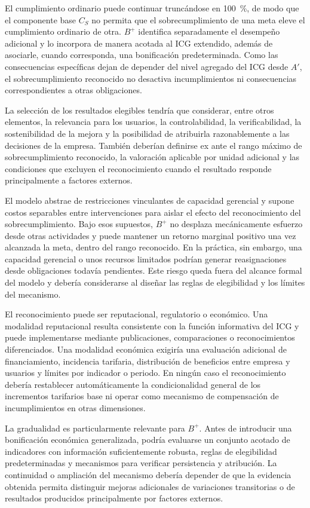 El cumplimiento ordinario puede continuar truncándose en 100~\%, de modo que el componente base \(C_S\) no permita que el sobrecumplimiento de una meta eleve el cumplimiento ordinario de otra. \(B^{+}\) identifica separadamente el desempeño adicional y lo incorpora de manera acotada al ICG extendido, además de asociarle, cuando corresponda, una bonificación predeterminada. Como las consecuencias específicas dejan de depender del nivel agregado del ICG desde \(A'\), el sobrecumplimiento reconocido no desactiva incumplimientos ni consecuencias correspondientes a otras obligaciones.

La selección de los resultados elegibles tendría que considerar, entre otros elementos, la relevancia para los usuarios, la controlabilidad, la verificabilidad, la sostenibilidad de la mejora y la posibilidad de atribuirla razonablemente a las decisiones de la empresa. También deberían definirse ex ante el rango máximo de sobrecumplimiento reconocido, la valoración aplicable por unidad adicional y las condiciones que excluyen el reconocimiento cuando el resultado responde principalmente a factores externos.

El modelo abstrae de restricciones vinculantes de capacidad gerencial y supone costos separables entre intervenciones para aislar el efecto del reconocimiento del sobrecumplimiento. Bajo esos supuestos, \(B^{+}\) no desplaza mecánicamente esfuerzo desde otras actividades y puede mantener un retorno marginal positivo una vez alcanzada la meta, dentro del rango reconocido. En la práctica, sin embargo, una capacidad gerencial o unos recursos limitados podrían generar reasignaciones desde obligaciones todavía pendientes. Este riesgo queda fuera del alcance formal del modelo y debería considerarse al diseñar las reglas de elegibilidad y los límites del mecanismo.

El reconocimiento puede ser reputacional, regulatorio o económico. Una modalidad reputacional resulta consistente con la función informativa del ICG y puede implementarse mediante publicaciones, comparaciones o reconocimientos diferenciados. Una modalidad económica exigiría una evaluación adicional de financiamiento, incidencia tarifaria, distribución de beneficios entre empresa y usuarios y límites por indicador o periodo. En ningún caso el reconocimiento debería restablecer automáticamente la condicionalidad general de los incrementos tarifarios base ni operar como mecanismo de compensación de incumplimientos en otras dimensiones.

La gradualidad es particularmente relevante para \(B^{+}\). Antes de introducir una bonificación económica generalizada, podría evaluarse un conjunto acotado de indicadores con información suficientemente robusta, reglas de elegibilidad predeterminadas y mecanismos para verificar persistencia y atribución. La continuidad o ampliación del mecanismo debería depender de que la evidencia obtenida permita distinguir mejoras adicionales de variaciones transitorias o de resultados producidos principalmente por factores externos.

